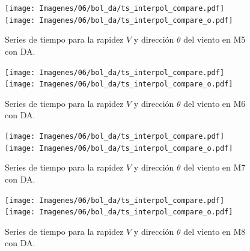 \vspace*{\fill}
\newpage
\vspace*{\fill}
\begin{figure}[H]
	\centering
	\texttt{[image: Imagenes/06/bol\_da/ts\_interpol\_compare.pdf]}\\%
	\texttt{[image: Imagenes/06/bol\_da/ts\_interpol\_compare\_o.pdf]}%
	\vspace{-2mm}\caption{Series de tiempo para la rapidez $V$ y dirección $\theta$ del viento en M5 con DA.}
	\label{fig:06_bol_da_ts_m5}
\end{figure}
\vspace*{\fill}
\begin{figure}[H]
	\centering
	\texttt{[image: Imagenes/06/bol\_da/ts\_interpol\_compare.pdf]}\\%
	\texttt{[image: Imagenes/06/bol\_da/ts\_interpol\_compare\_o.pdf]}%
	\vspace{-2mm}\caption{Series de tiempo para la rapidez $V$ y dirección $\theta$ del viento en M6 con DA.}
	\label{fig:06_bol_da_ts_m6}
\end{figure}
\vspace*{\fill}
\newpage
\vspace*{\fill}
\begin{figure}[H]
	\centering
	\texttt{[image: Imagenes/06/bol\_da/ts\_interpol\_compare.pdf]}\\%
	\texttt{[image: Imagenes/06/bol\_da/ts\_interpol\_compare\_o.pdf]}%
	\vspace{-2mm}\caption{Series de tiempo para la rapidez $V$ y dirección $\theta$ del viento en M7 con DA.}
	\label{fig:06_bol_da_ts_m7}
\end{figure}
\vspace*{\fill}
\begin{figure}[H]
	\centering
	\texttt{[image: Imagenes/06/bol\_da/ts\_interpol\_compare.pdf]}\\%
	\texttt{[image: Imagenes/06/bol\_da/ts\_interpol\_compare\_o.pdf]}%
	\vspace{-2mm}\caption{Series de tiempo para la rapidez $V$ y dirección $\theta$ del viento en M8 con DA.}
	\label{fig:06_bol_da_ts_m8}
\end{figure}
\vspace*{\fill}
\newpage

